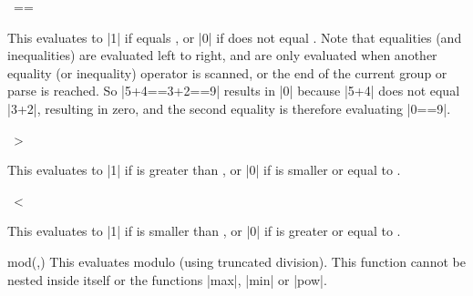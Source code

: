 \begin{math-operator}{\ ==\ } 

	This evaluates to |1| if  equals , or |0| if 
	does not equal . 
	Note that equalities (and inequalities) are evaluated left to right, 
	and are only evaluated when another equality (or inequality) operator 
	is scanned, or the end of the current group or parse is reached. So 
	|5+4==3+2==9| results in |0| because |5+4| does not equal |3+2|, 
	resulting in zero, and the second equality is therefore evaluating 
	|0==9|.

\begin{codeexample}[]
 \pgfmathresult
\end{codeexample}

\end{math-operator}


\begin{math-operator}{\ >\ } 

	This evaluates to |1| if  is greater than , or |0| if 
	 is smaller or equal to .
	
\begin{codeexample}[]
 \pgfmathresult
\end{codeexample}

\end{math-operator}

\begin{math-operator}{\ <\ }

	This evaluates to |1| if  is smaller than , or |0| if
	 is greater or equal to .
	
\begin{codeexample}[]
 \pgfmathresult
\end{codeexample}

\end{math-operator}

\begin{math-function}{mod(,)}
	This evaluates  modulo  (using truncated division).
	This function cannot be nested inside itself or the functions |max|, 
	|min| or |pow|.

\begin{codeexample}[]
 \pgfmathresult
\end{codeexample}

\end{math-function}

